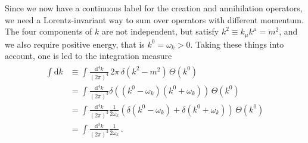 \documentclass[12pt]{report}
\renewcommand{\d}{\text{d}}
\newcommand{\dkbar}{\ensuremath{\overline{\d k}}}
\newcommand{\2}{\ensuremath{\sqrt{2}\,}}
\renewcommand{\d}{\ensuremath{\text{d}}}
\begin{document}
      Since we now have a continuous label for the creation and annihilation operators, we need a
      Lorentz-invariant way to sum over operators with different momentum. The four components
      of $k$ are not independent, but satisfy $k^2\equiv k_\mu k^\mu=m^2$, and we also require
      positive energy, that is $k^0=\omega_k>0$. Taking these things into account, one is led to the
      integration measure
      \begin{align}
        \begin{split}
          \int \dkbar &\equiv \int \frac{\d^4 k}{\left(2\pi\right)^4}
            \,2\pi\,\delta\!\left(k^2-m^2\right) \,\Theta\!\left(k^0\right)\\
          &= \int \frac{\d^4 k}{\left(2\pi\right)^3}
            \delta\!\left(\left(k^0-\omega_k\right)\left(k^0+\omega_k\right)\right)
            \,\Theta\!\left(k^0\right)\\ 
          &=\int \frac{\d^4 k}{\left(2\pi\right)^3}
            \frac{1}{2\omega_k}\left(\delta\!\left(k^0-\omega_k\right)
              +\delta\!\left(k^0+\omega_k\right) \right) \,\Theta\!\left(k^0\right)\\
          &=\int \frac{\d^3 k}{\left(2\pi\right)^3}\frac{1}{2\omega_k}\,.
        \end{split}
      \end{align}
\end{document}
